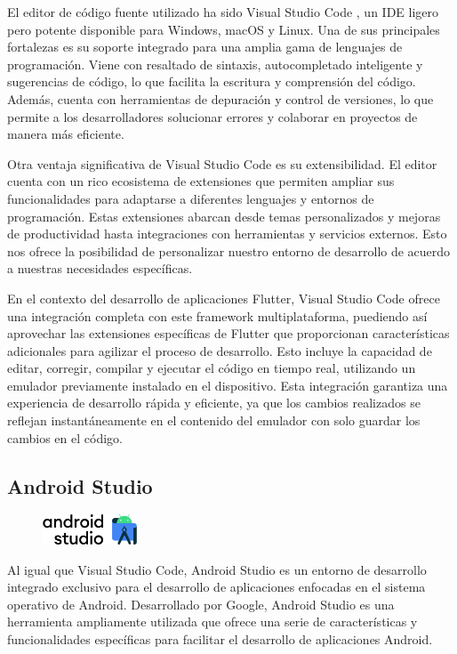 \documentclass{article}
\begin{document}
El editor de código fuente utilizado ha sido Visual Studio Code \cite{VSCode}, un IDE ligero pero potente disponible para Windows, macOS y Linux. Una de sus principales fortalezas es su soporte integrado para una amplia gama de lenguajes de programación. Viene con resaltado de sintaxis, autocompletado inteligente y sugerencias de código, lo que facilita la escritura y comprensión del código. Además, cuenta con herramientas de depuración y control de versiones, lo que permite a los desarrolladores solucionar errores y colaborar en proyectos de manera más eficiente.

Otra ventaja significativa de Visual Studio Code es su extensibilidad. El editor cuenta con un rico ecosistema de extensiones que permiten ampliar sus funcionalidades para adaptarse a diferentes lenguajes y entornos de programación. Estas extensiones abarcan desde temas personalizados y mejoras de productividad hasta integraciones con herramientas y servicios externos. Esto nos ofrece la posibilidad de personalizar nuestro entorno de desarrollo de acuerdo a nuestras necesidades específicas.

En el contexto del desarrollo de aplicaciones Flutter, Visual Studio Code ofrece una integración completa con este framework multiplataforma, puediendo así aprovechar las extensiones específicas de Flutter que proporcionan características adicionales para agilizar el proceso de desarrollo. Esto incluye la capacidad de editar, corregir, compilar y ejecutar el código en tiempo real, utilizando un emulador previamente instalado en el dispositivo. Esta integración garantiza una experiencia de desarrollo rápida y eficiente, ya que los cambios realizados se reflejan instantáneamente en el contenido del emulador con solo guardar los cambios en el código.

\subsection{Android Studio}

\begin{figure}[h]
    \centering
    \includegraphics[width=0.25\textwidth]{imagenes/logos/logo_androidstudio.png}
\end{figure}

\vspace{0.3cm}

Al igual que Visual Studio Code, Android Studio \cite{Android Studio} es un entorno de desarrollo integrado exclusivo para el desarrollo de aplicaciones enfocadas en el sistema operativo de Android. Desarrollado por Google, Android Studio es una herramienta ampliamente utilizada que ofrece una serie de características y funcionalidades específicas para facilitar el desarrollo de aplicaciones Android.
\end{document}
